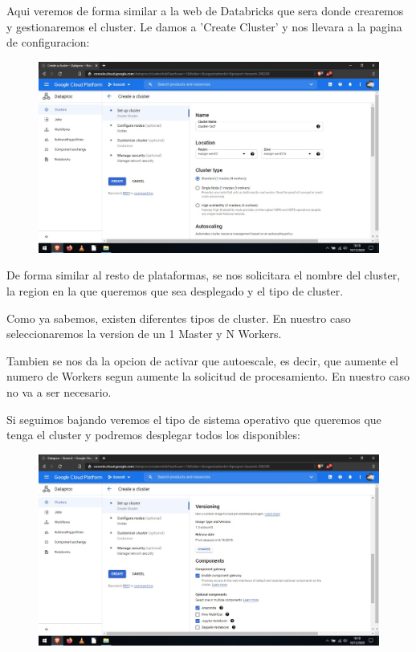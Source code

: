 \documentclass[a4paper,10pt]{article}
\begin{document}
Aqui veremos de forma similar a la web de Databricks que sera donde crearemos y gestionaremos el cluster. Le damos a 'Create Cluster' y nos llevara a la pagina de configuracion:

\begin{figure}[H]
\begin{center}
\includegraphics[width=500pt]{./fotos/GoogleCloud/23 - GC.jpg}
\end{center}
\end{figure}

De forma similar al resto de plataformas, se nos solicitara el nombre del cluster, la region en la que queremos que sea desplegado y el tipo de cluster. 

Como ya sabemos, existen diferentes tipos de cluster. En nuestro caso seleccionaremos la version de un 1 Master y N Workers. 

Tambien se nos da la opcion de activar que autoescale, es decir, que aumente el numero de Workers segun aumente la solicitud de procesamiento. En nuestro caso no va a ser necesario.

Si seguimos bajando veremos el tipo de sistema operativo que queremos que tenga el cluster y podremos desplegar todos los disponibles:

\begin{figure}[H]
\begin{center}
\includegraphics[width=500pt]{./fotos/GoogleCloud/24 - GC.jpg}
\end{center}
\end{figure}
\end{document}
